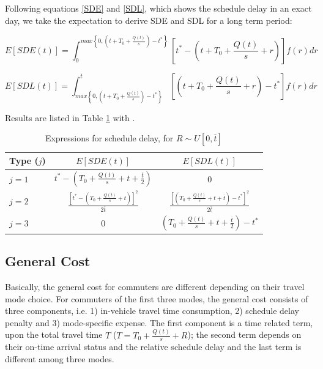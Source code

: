 \documentclass[a4paper,11pt]{article}
\begin{document}
Following equations \ref{SDE} and \ref{SDL}, which shows the schedule delay in an exact day, we take the expectation to derive SDE and SDL for a long term period:

\begin{equation}
E\left[SDE(t)\right]=\int^{max \left\{0, \left(t+T_0+\frac{Q(t)}{s}\right)-t^*\right\}}_0
\left[t^*-\left(t+T_0+\frac{Q(t)}{s}+r\right) \right]f(r)dr
\label{ESDE}
\end{equation}

\begin{equation}
E\left[SDL(t)\right]=\int^{\overline{t}}_{max \left\{0, \left(t+T_0+\frac{Q(t)}{s}\right)-t^*\right\}} 
\left[\left(t+T_0+\frac{Q(t)}{s}+r\right)-t^*\right]f(r)dr
\label{ESDL}
\end{equation}

Results are listed in Table \ref{tab:schedule delay} with .

\begin{table}[htbp]
 \caption{Expressions for schedule delay, for $R\sim U[0,\overline{t}]$ \label{tab:schedule delay}}
 \begin{center}
 \begin{tabular}{lcc}
 
  \toprule
   Type ($j$) & $E[SDE(t)]$ & $E[SDL(t)]$   \\
  \midrule
 $j=1$ & $t^*-\left(T_0+\frac{Q(t)}{s}+t+\frac{\overline{t}}{2} \right)$ & 0 \\
 $j=2$ & $ \frac{\left[ t^*-\left(T_0+\frac{Q(t)}{s}+t \right) \right]^2}{2\overline{t}} $ & $\frac{\left[ \left(T_0+\frac{Q(t)}{s}+t+\overline{t} \right)-t^* \right]^2}{2\overline{t}}$ \\
 $j=3$ & 0 &  $\left(T_0+\frac{Q(t)}{s}+t+\frac{\overline{t}}{2} \right)-t^*$ \\
  \bottomrule
  
 \end{tabular}
 \end{center}
\end{table}



\subsection{General Cost} \label{subsec:General cost}

Basically, the general cost for commuters are different depending on their travel mode choice. For commuters of the first three modes, the general cost consists of three components, i.e. 1) in-vehicle travel time consumption, 2) schedule delay penalty and 3) mode-specific expense. The  first component is a time related term, upon the total travel time $T$ ($T=T_0+\frac{Q(t)}{s}+R$); the second term depends on their on-time arrival status and the relative schedule delay and the last term is different among three modes.
\end{document}
